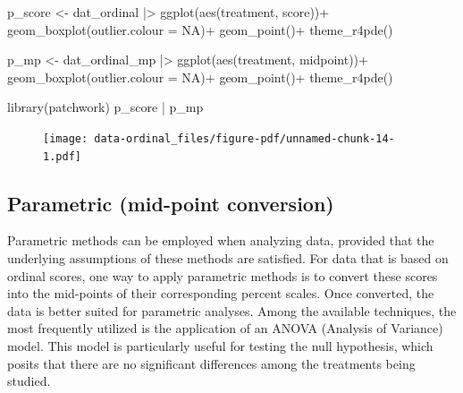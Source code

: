 \documentclass[
  letterpaper,
]{book}
\newenvironment{Shaded}{\begin{snugshade}}{\end{snugshade}}
\newcommand{\AttributeTok}[1]{\textcolor[rgb]{0.40,0.45,0.13}{#1}}
\newcommand{\ConstantTok}[1]{\textcolor[rgb]{0.56,0.35,0.01}{#1}}
\newcommand{\FunctionTok}[1]{\textcolor[rgb]{0.28,0.35,0.67}{#1}}
\newcommand{\NormalTok}[1]{\textcolor[rgb]{0.00,0.23,0.31}{#1}}
\newcommand{\OtherTok}[1]{\textcolor[rgb]{0.00,0.23,0.31}{#1}}
\newcommand{\SpecialCharTok}[1]{\textcolor[rgb]{0.37,0.37,0.37}{#1}}
\begin{document}
\begin{Shaded}
\begin{Highlighting}[]
\NormalTok{p\_score }\OtherTok{\textless{}{-}}\NormalTok{ dat\_ordinal }\SpecialCharTok{|\textgreater{}} 
  \FunctionTok{ggplot}\NormalTok{(}\FunctionTok{aes}\NormalTok{(treatment, score))}\SpecialCharTok{+}
  \FunctionTok{geom\_boxplot}\NormalTok{(}\AttributeTok{outlier.colour =} \ConstantTok{NA}\NormalTok{)}\SpecialCharTok{+}
  \FunctionTok{geom\_point}\NormalTok{()}\SpecialCharTok{+}
  \FunctionTok{theme\_r4pde}\NormalTok{()}

\NormalTok{p\_mp }\OtherTok{\textless{}{-}}\NormalTok{ dat\_ordinal\_mp }\SpecialCharTok{|\textgreater{}} 
  \FunctionTok{ggplot}\NormalTok{(}\FunctionTok{aes}\NormalTok{(treatment, midpoint))}\SpecialCharTok{+}
  \FunctionTok{geom\_boxplot}\NormalTok{(}\AttributeTok{outlier.colour =} \ConstantTok{NA}\NormalTok{)}\SpecialCharTok{+}
  \FunctionTok{geom\_point}\NormalTok{()}\SpecialCharTok{+}
  \FunctionTok{theme\_r4pde}\NormalTok{()}

\FunctionTok{library}\NormalTok{(patchwork)}
\NormalTok{p\_score }\SpecialCharTok{|}\NormalTok{ p\_mp}
\end{Highlighting}
\end{Shaded}

\begin{figure}[H]

{\centering \texttt{[image: data-ordinal\_files/figure-pdf/unnamed-chunk-14-1.pdf]}

}

\end{figure}

\hypertarget{parametric-mid-point-conversion}{%
\subsection{Parametric (mid-point
conversion)}\label{parametric-mid-point-conversion}}

Parametric methods can be employed when analyzing data, provided that
the underlying assumptions of these methods are satisfied. For data that
is based on ordinal scores, one way to apply parametric methods is to
convert these scores into the mid-points of their corresponding percent
scales. Once converted, the data is better suited for parametric
analyses. Among the available techniques, the most frequently utilized
is the application of an ANOVA (Analysis of Variance) model. This model
is particularly useful for testing the null hypothesis, which posits
that there are no significant differences among the treatments being
studied.
\end{document}
